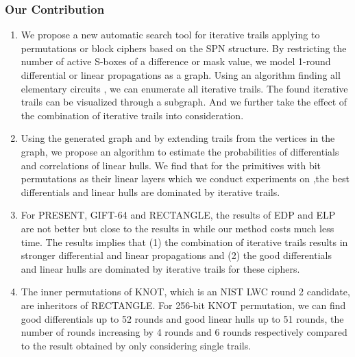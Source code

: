 \subsubsection{Our Contribution}
\begin{enumerate}
    \item We propose a new automatic search tool for iterative trails applying to permutations or block ciphers based on the SPN structure. By restricting the number of active S-boxes of a difference or mask value, we model 1-round differential or linear propagations as a graph. Using an algorithm finding all elementary circuits \cite{J75}, we can enumerate all iterative trails. The found iterative trails can be visualized through a subgraph. And we further take the effect of the combination of iterative trails into consideration. 
    \item Using the generated graph and by extending trails from the vertices in the graph, we propose an algorithm to estimate the probabilities of differentials and correlations of linear hulls. We find that for the primitives with bit permutations as their linear layers which we conduct experiments on ,the best differentials and linear hulls are dominated by iterative trails.
    \item For PRESENT, GIFT-64 and RECTANGLE, the results of EDP and ELP are not better but close to the results in \cite{HV18} while our method costs much less time. The results implies that (1) the combination of iterative trails results in stronger differential and linear propagations and (2) the good differentials and linear hulls are dominated by iterative trails for these ciphers.
    \item The inner permutations of KNOT, which is an NIST LWC round 2 candidate, are inheritors of RECTANGLE. For 256-bit KNOT permutation, we can find good differentials up to 52 rounds and good linear hulls up to 51 rounds, the number of rounds increasing by 4 rounds and 6 rounds respectively compared to the result obtained by only considering single trails. 

\end{enumerate}

